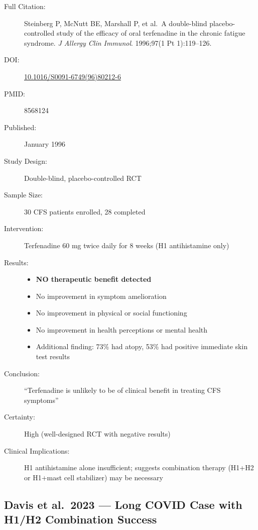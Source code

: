 \begin{description}
    \item[Full Citation:] Steinberg P, McNutt BE, Marshall P, et al.\ A double-blind placebo-controlled study of the efficacy of oral terfenadine in the chronic fatigue syndrome. \textit{J Allergy Clin Immunol}. 1996;97(1 Pt 1):119--126.
    \item[DOI:] \href{https://doi.org/10.1016/S0091-6749(96)80212-6}{10.1016/S0091-6749(96)80212-6}
    \item[PMID:] 8568124
    \item[Published:] January 1996
    \item[Study Design:] Double-blind, placebo-controlled RCT
    \item[Sample Size:] 30 CFS patients enrolled, 28 completed
    \item[Intervention:] Terfenadine 60 mg twice daily for 8 weeks (H1 antihistamine only)
    \item[Results:]
    \begin{itemize}
        \item \textbf{NO therapeutic benefit detected}
        \item No improvement in symptom amelioration
        \item No improvement in physical or social functioning
        \item No improvement in health perceptions or mental health
        \item Additional finding: 73\% had atopy, 53\% had positive immediate skin test results
    \end{itemize}
    \item[Conclusion:] ``Terfenadine is unlikely to be of clinical benefit in treating CFS symptoms''
    \item[Certainty:] High (well-designed RCT with negative results)
    \item[Clinical Implications:] H1 antihistamine alone insufficient; suggests combination therapy (H1+H2 or H1+mast cell stabilizer) may be necessary
\end{description}

\subsection{Davis et al.\ 2023 --- Long COVID Case with H1/H2 Combination Success}

